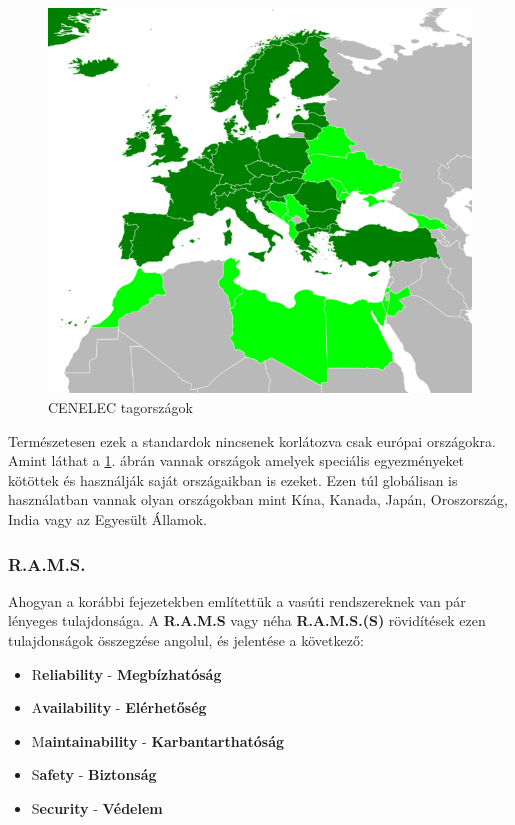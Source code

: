 \documentclass[a4paper,12pt]{article}
\begin{document}
\begin{figure}
    \vspace{-20pt}
    \centering
    \includegraphics[scale=0.8]{images/CENELEC_membership.png}
    \caption[CENELEC tagországok]{CENELEC tagországok}
    \label{fig:cenelec_members}
\end{figure}

Természetesen ezek a standardok nincsenek korlátozva csak európai országokra. 
Amint láthat a \ref{fig:cenelec_members}. ábrán vannak országok amelyek speciális egyezményeket kötöttek és használják saját országaikban is ezeket. 
Ezen túl globálisan is használatban vannak olyan országokban mint Kína, Kanada, Japán, Oroszország, India vagy az Egyesült Államok.

\subsubsection{R.A.M.S.}

Ahogyan a korábbi fejezetekben említettük a vasúti rendszereknek van pár lényeges tulajdonsága. 
A \textbf{R.A.M.S} vagy néha \textbf{R.A.M.S.(S)} rövidítések ezen tulajdonságok összegzése angolul, és jelentése a következő:

\begin{itemize}
	\item {\huge R}\textbf{eliability} -  \textbf{Megbízhatóság}
	\item {\huge A}\textbf{vailability} - \textbf{Elérhetőség}
	\item {\huge M}\textbf{aintainability} - \textbf{Karbantarthatóság}
	\item {\huge S}\textbf{afety} - \textbf{Biztonság}
	\item {\huge S}\textbf{ecurity} - \textbf{Védelem}
\end{itemize}
\end{document}
